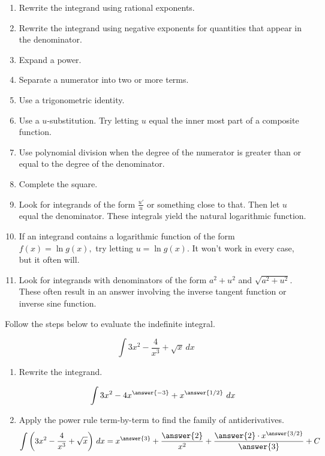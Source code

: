 \documentclass{ximera}
\begin{document}
\begin{enumerate}
\item Rewrite the integrand using rational exponents.

\item Rewrite the integrand using negative exponents for quantities that appear in the denominator. 

\item Expand a power.

\item Separate a numerator into two or more terms.

\item Use a trigonometric identity.

\item Use a $u$-substitution. Try letting $u$ equal the inner most part of a composite function.

\item Use polynomial division when the degree of the numerator is greater than or equal
to the degree of the denominator.

\item Complete the square.

\item Look for integrands of the form $\textstyle \frac{u'}{u}$ or something close to that. Then let $u$ equal the
denominator. These integrals yield the natural logarithmic function.

\item If an integrand contains a logarithmic function of the form $f(x) = \ln g(x),$ try letting $u = \ln g(x).$ It won’t work in every case, but it often will.

\item Look for integrands with denominators of the form $a^2+u^2$ and $\sqrt{a^2+ u^2}.$ These often result in an answer involving the inverse tangent function or inverse sine function.

\end{enumerate}


\begin{problem}
Follow the steps below to evaluate the indefinite integral.

\[
\int  3x^2 - \frac{4}{x^3} + \sqrt{x}  \, dx
\]

\begin{enumerate}
\item Rewrite the integrand.

\[
\int 3x^2 - 4x^{\answer{-3}} + x^{\answer{1/2}} \ dx
\]

\item Apply the power rule term-by-term to find the family of antiderivatives.
\[
\int \left( 3x^2 - \frac{4}{x^3} + \sqrt{x} \right) \, dx = x^{\answer{3}} + \frac{\answer{2}}{x^2} + 
\frac{\answer{2} \cdot x^{\answer{3/2}}}{\answer{3}} + C
\]

\end{enumerate}
\end{problem}
\end{document}
